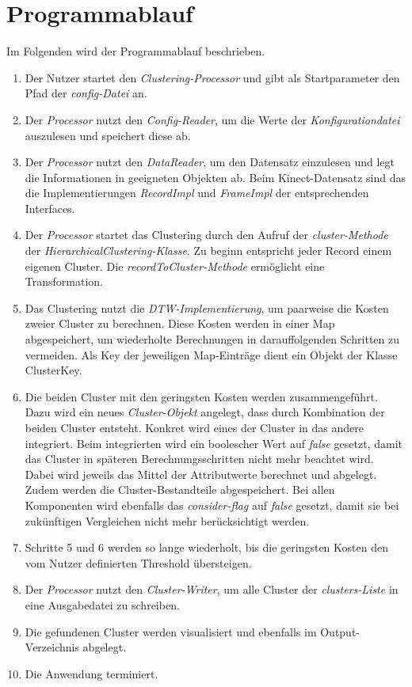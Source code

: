 \section{Programmablauf}
\label{4-Programmablauf}
Im Folgenden wird der Programmablauf beschrieben.
\begin{enumerate}
    \item Der Nutzer startet den \emph{Clustering-Processor}
    und gibt als Startparameter den Pfad der \emph{config-Datei} an.
    \item Der \emph{Processor} nutzt den \emph{Config-Reader}, um die Werte der \emph{Konfigurationdatei} auszulesen
    und speichert diese ab.
    \item Der \emph{Processor} nutzt den \emph{DataReader}, um den Datensatz einzulesen
    und legt die Informationen in geeigneten Objekten ab.
    Beim Kinect-Datensatz sind das die Implementierungen \emph{RecordImpl} und \emph{FrameImpl}
    der entsprechenden Interfaces.
    \item Der \emph{Processor} startet das Clustering durch den Aufruf der \emph{cluster-Methode}
    der \emph{HierarchicalClustering-Klasse}.
    Zu beginn entspricht jeder Record einem eigenen Cluster.
    Die \emph{recordToCluster-Methode} ermöglicht eine Transformation.
    \item Das Clustering nutzt die \emph{\ac{DTW}-Implementierung},
    um paarweise die Kosten zweier Cluster zu berechnen.
    Diese Kosten werden in einer Map abgespeichert, um wiederholte Berechnungen in darauffolgenden Schritten zu vermeiden.
    Als Key der jeweiligen Map-Einträge dient ein Objekt der Klasse ClusterKey.
    \item Die beiden Cluster mit den geringsten Kosten werden zusammengeführt.
    Dazu wird ein neues \emph{Cluster-Objekt} angelegt, dass durch Kombination der beiden Cluster entsteht.
    Konkret wird eines der Cluster in das andere integriert.
    Beim integrierten wird ein boolescher Wert auf \emph{false} gesetzt,
    damit das Cluster in späteren Berechnungsschritten nicht mehr beachtet wird.
    Dabei wird jeweils das Mittel der Attributwerte berechnet und abgelegt.
    Zudem werden die Cluster-Bestandteile abgespeichert.
    Bei allen Komponenten wird ebenfalls das \emph{consider-flag} auf \emph{false} gesetzt,
    damit sie bei zukünftigen Vergleichen nicht mehr berücksichtigt werden.
    \item Schritte 5 und 6 werden so lange wiederholt, bis die geringsten Kosten den vom Nutzer definierten Threshold übersteigen.
    \item Der \emph{Processor} nutzt den \emph{Cluster-Writer}, um alle Cluster der \emph{clusters-Liste}
    in eine Ausgabedatei zu schreiben.
    \item Die gefundenen Cluster werden visualisiert und ebenfalls im Output-Verzeichnis abgelegt.
    \item Die Anwendung terminiert. 

\end{enumerate}


